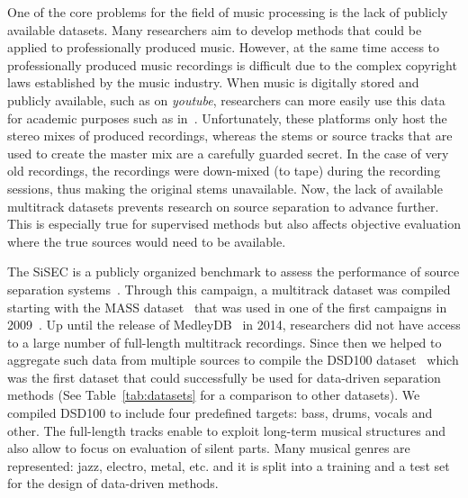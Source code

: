 One of the core problems for the field of music processing is the lack of publicly available datasets.
Many researchers aim to develop methods that could be applied to professionally produced music. 
However, at the same time access to professionally produced music recordings is difficult due to the complex copyright laws established by the music industry.
When music is digitally stored and publicly available, such as on \emph{youtube}, researchers can more easily use this data for academic purposes such as in~\cite{balke17}.
Unfortunately, these platforms only host the stereo mixes of produced recordings, whereas the stems or source tracks that are used to create the master mix are a carefully guarded secret.
In the case of very old recordings, the recordings were down-mixed (to tape) during the recording sessions, thus making the original stems unavailable.
Now, the lack of available multitrack datasets prevents research on source separation to advance further.
This is especially true for supervised methods but also affects objective evaluation where the true sources would need to be available.
\par
The \ac{SiSEC} is a publicly organized benchmark to assess the performance of source separation systems~\cite{sisec13, ono15, liutkus17, stoeter18sisec}. 
Through this campaign, a multitrack dataset was compiled starting with the MASS dataset~\cite{MTGMASSdb} that was used in one of the first campaigns in 2009~\cite{vincent09}.
Up until the release of MedleyDB~\cite{bittner14} in 2014, researchers did not have access to a large number of full-length multitrack recordings.
Since then we helped to aggregate such data from multiple sources to compile the DSD100 dataset~\cite{liutkus17} which was the first dataset that could successfully be used for data-driven separation methods (See Table~\ref{tab:datasets} for a comparison to other datasets).
We compiled DSD100 to include four predefined targets: bass, drums, vocals and other.
The full-length tracks enable to exploit long-term musical structures and also allow to focus on evaluation of silent parts.
Many musical genres are represented: jazz, electro, metal, etc. and it is split into a training and a test set for the design of data-driven methods.

